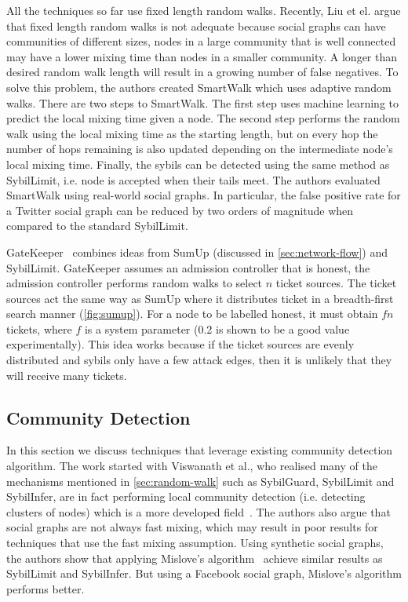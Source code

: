 All the techniques so far use fixed length random walks. Recently, Liu et el.
argue that fixed length random walks is not adequate because social graphs can
have communities of different sizes, nodes in a large community that is well
connected may have a lower mixing time than nodes in a smaller community. A
longer than desired random walk length will result in a growing number of false
negatives. To solve this problem, the authors created
SmartWalk\cite{liu2016smartwalk} which uses adaptive random walks. There are two
steps to SmartWalk. The first step uses machine learning to predict the local
mixing time given a node. The second step performs the random walk using the
local mixing time as the starting length, but on every hop the number of hops
remaining is also updated depending on the intermediate node's local mixing
time. Finally, the sybils can be detected using the same method as SybilLimit,
i.e. node is accepted when their tails meet. The authors evaluated SmartWalk
using real-world social graphs. In particular, the false positive rate for a
Twitter social graph can be reduced by two orders of magnitude when compared to
the standard SybilLimit.

GateKeeper~\cite{tran2011optimal} combines ideas from SumUp (discussed in
\autoref{sec:network-flow}) and SybilLimit. GateKeeper assumes an admission
controller that is honest, the admission controller performs random walks to
select $n$ ticket sources. The ticket sources act the same way as SumUp where it
distributes ticket in a breadth-first search manner (\autoref{fig:sumup}). For a
node to be labelled honest, it must obtain $fn$ tickets, where $f$ is a system
parameter (0.2 is shown to be a good value experimentally). This idea works
because if the ticket sources are evenly distributed and sybils only have a few
attack edges, then it is unlikely that they will receive many 
tickets.


\subsection{Community Detection}\label{sec:community-detection}
In this section we discuss techniques that leverage existing community detection
algorithm. The work started with Viswanath et al., who realised many of the
mechanisms mentioned in \autoref{sec:random-walk} such as SybilGuard, SybilLimit
and SybilInfer, are in fact performing local community detection (i.e. detecting
clusters of nodes) which is a more developed field~\cite{viswanath2010analysis}.
The authors also argue that social graphs are not always fast mixing, which may
result in poor results for techniques that use the fast mixing assumption.
Using synthetic social graphs, the authors show that applying Mislove's
algorithm~\cite{mislove2010you} achieve similar results as SybilLimit and
SybilInfer. But using a Facebook social graph, Mislove's algorithm performs
better.

